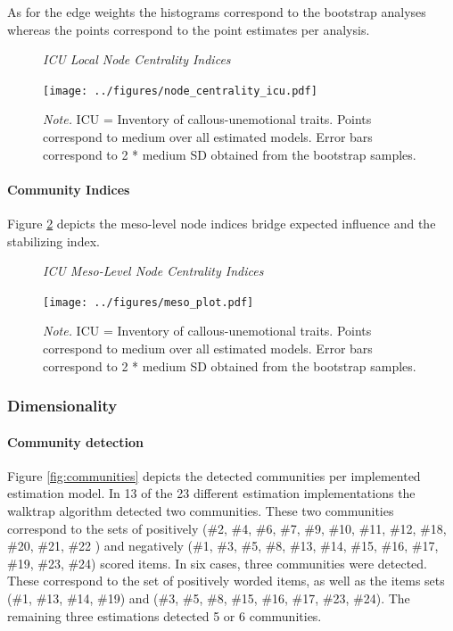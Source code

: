 \documentclass[a4paper,12pt]{article} %
\begin{document}
As for the edge weights the histograms correspond to the bootstrap analyses whereas the points correspond to the point estimates per analysis.

\begin{figure}[H]
	\caption{\label{fig:icu_node_indices}\protect\linebreak[1]\textit{ICU Local Node Centrality Indices}}
	\centering
	\texttt{[image: ../figures/node\_centrality\_icu.pdf]}
	\caption*{\textit{Note.} ICU = Inventory of callous-unemotional traits. Points correspond to medium over all estimated models. Error bars correspond to 2 * medium SD obtained from the bootstrap samples.}
\end{figure}


\paragraph{Community Indices}
Figure \ref{fig:meso_plot} depicts the meso-level node indices bridge expected influence and the stabilizing index. 

\begin{figure}[H]
	\caption{\label{fig:meso_plot}\protect\linebreak[1]\textit{ICU Meso-Level Node Centrality Indices}}
	\centering
	\texttt{[image: ../figures/meso\_plot.pdf]}
	\caption*{\textit{Note.} ICU = Inventory of callous-unemotional traits. Points correspond to medium over all estimated models. Error bars correspond to 2 * medium SD obtained from the bootstrap samples.}
\end{figure}

\subsubsection{Dimensionality}
\paragraph{Community detection}
Figure \ref{fig:communities} depicts the detected communities per implemented estimation model.
In 13 of the 23 different estimation implementations the walktrap algorithm detected two communities.
These two communities correspond to the sets of positively (\#2, \#4, \#6, \#7, \#9, \#10, \#11, \#12, \#18, \#20, \#21, \#22 ) and negatively (\#1, \#3, \#5, \#8, \#13, \#14, \#15, \#16, \#17, \#19, \#23, \#24) scored items.
In six cases, three communities were detected. 
These correspond to the set of positively worded items, as well as the items sets (\#1, \#13, \#14, \#19) and (\#3, \#5, \#8, \#15, \#16, \#17, \#23, \#24).    
The remaining three estimations detected 5 or 6 communities.
\end{document}
